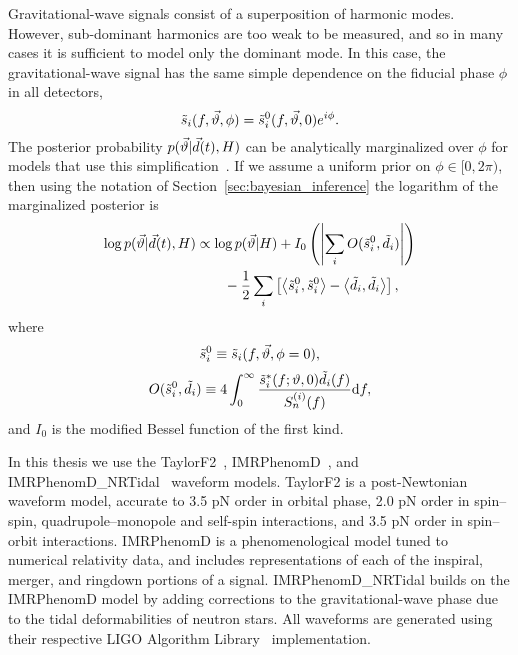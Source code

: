Gravitational-wave signals  consist of a superposition of harmonic
modes. However, sub-dominant harmonics are too weak to be measured, and so in many cases it is sufficient to model only the dominant mode. In this case, the gravitational-wave signal has the same simple dependence on the fiducial phase $\phi$ in all detectors,
\begin{equation}
\tilde{s}_i(f, \vec{\vartheta}, \phi) = \tilde{s}_i^0(f, \vec{\vartheta}, 0) e^{i\phi}.
\end{equation}
The posterior probability $p(\vec{\vartheta}|\vec{d}(t),H)$ can be analytically marginalized over $\phi$
for models that use this simplification~\cite{wainstein:1962}. If we assume a uniform prior on
$\phi \in [0,2\pi)$, then using the notation of Section~\ref{sec:bayesian_inference} the logarithm of the marginalized posterior is
\begin{eqnarray}
\label{eqn:marginalized_phase}
\log p(\vec{\vartheta}|\vec{d}(t),H) &\propto \log p(\vec{\vartheta}|H) +
        I_0\left(\left|\sum_i O(\tilde{s}^0_i, \tilde{d}_i)\right|\right) \nonumber \\
        & \qquad - \frac{1}{2}\sum_i\left[ \left<\tilde{s}^0_i, \tilde{s}^0_i\right> -
                                \left<\tilde{d}_i, \tilde{d}_i\right> \right],
\end{eqnarray}
where
\begin{equation*}
\tilde{s}_i^0 \equiv \tilde{s}_i(f, \vec{\vartheta}, \phi=0),
\end{equation*}
\begin{equation*}
O(\tilde{s}^0_i, \tilde{d}_i) \equiv 4 \int_0^\infty
        \frac{\tilde{s}_i^*(f; \vartheta,0)\tilde{d}_i(f)}{S^{(i)}_n(f)}\mathrm{d}f,
\end{equation*}
and $I_0$ is the modified Bessel function of the first kind.

In this thesis we use the TaylorF2~\cite{Sathyaprakash:1991mt,Buonanno:2009zt,Arun:2008kb,Mikoczi:2005dn,Bohe:2013cla,Vines:2011ud}, IMRPhenomD~\cite{Husa:2015iqa,Khan:2015jqa}, and IMRPhenomD\_NRTidal~\cite{Husa:2015iqa,Khan:2015jqa,Dietrich:2017aum} waveform models. TaylorF2 is a post-Newtonian waveform model, accurate to 3.5 pN order in orbital phase, 2.0 pN order in spin--spin, quadrupole--monopole and self-spin interactions, and 3.5 pN order in spin--orbit interactions. IMRPhenomD is a phenomenological model tuned to numerical relativity data, and includes representations of each of the inspiral, merger, and ringdown portions of a signal. IMRPhenomD\_NRTidal builds on the IMRPhenomD model by adding corrections to the gravitational-wave phase due to the tidal deformabilities of neutron stars. All waveforms are generated using their respective LIGO Algorithm Library~\cite{lal} implementation.

